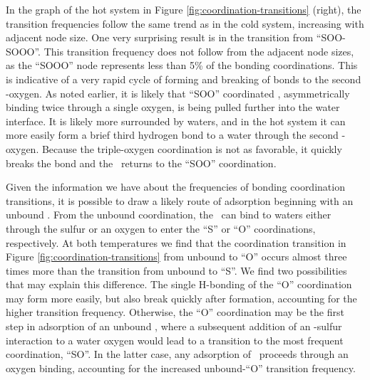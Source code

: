 \documentclass{article}
\begin{document}
In the graph of the hot system in Figure \ref{fig:coordination-transitions} (right), the transition frequencies follow the same trend as in the cold system, increasing with adjacent node size. One very surprising result is in the transition from ``SOO-SOOO''. This transition frequency does not follow from the adjacent node sizes, as the ``SOOO'' node represents less than 5\% of the bonding coordinations. This is indicative of a very rapid cycle of forming and breaking of bonds to the second \suldiox-oxygen. As noted earlier, it is likely that ``SOO'' coordinated \suldiox, asymmetrically binding twice through a single oxygen, is being pulled further into the water interface. It is likely more surrounded by waters, and in the hot system it can more easily form a brief third hydrogen bond to a water through the second \suldiox-oxygen. Because the triple-oxygen coordination is not as favorable, it quickly breaks the bond and the \suldiox~returns to the ``SOO'' coordination.

Given the information we have about the frequencies of bonding coordination transitions, it is possible to draw a likely route of adsorption beginning with an unbound \suldiox. From the unbound coordination, the \suldiox~can bind to waters either through the sulfur or an oxygen to enter the ``S'' or ``O'' coordinations, respectively. At both temperatures we find that the coordination transition in Figure \ref{fig:coordination-transitions} from unbound to ``O'' occurs almost three times more than the transition from unbound to ``S''. We find two possibilities that may explain this difference. The single H-bonding of the ``O'' coordination may form more easily, but also break quickly after formation, accounting for the higher transition frequency. Otherwise, the ``O'' coordination may be the first step in adsorption of an unbound \suldiox, where a subsequent addition of an \suldiox-sulfur interaction to a water oxygen would lead to a transition to the most frequent coordination, ``SO''. In the latter case, any adsorption of \suldiox~proceeds through an oxygen binding, accounting for the increased unbound-``O'' transition frequency.
\end{document}
